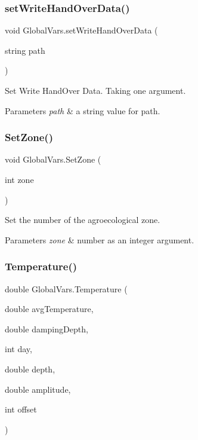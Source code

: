 \subsubsection{\texorpdfstring{setWriteHandOverData()}{setWriteHandOverData()}}
{\footnotesize\ttfamily void Global\+Vars.\+set\+Write\+Hand\+Over\+Data (\begin{DoxyParamCaption}\item[{string}]{path }\end{DoxyParamCaption})\hspace{0.3cm}{\ttfamily [inline]}}



Set Write Hand\+Over Data. Taking one argument. 


\begin{DoxyParams}{Parameters}
{\em path} & a string value for path. \\
\hline
\end{DoxyParams}
\mbox{\label{class_global_vars_acbf66e9e99a98cb7d6e317afaba4519e}} 
\subsubsection{\texorpdfstring{SetZone()}{SetZone()}}
{\footnotesize\ttfamily void Global\+Vars.\+Set\+Zone (\begin{DoxyParamCaption}\item[{int}]{zone }\end{DoxyParamCaption})\hspace{0.3cm}{\ttfamily [inline]}}



Set the number of the agroecological zone. 


\begin{DoxyParams}{Parameters}
{\em zone} & number as an integer argument. \\
\hline
\end{DoxyParams}
\mbox{\label{class_global_vars_a491bc8bab10f56f0c721d2b86c6e5a30}} 
\subsubsection{\texorpdfstring{Temperature()}{Temperature()}}
{\footnotesize\ttfamily double Global\+Vars.\+Temperature (\begin{DoxyParamCaption}\item[{double}]{avg\+Temperature,  }\item[{double}]{damping\+Depth,  }\item[{int}]{day,  }\item[{double}]{depth,  }\item[{double}]{amplitude,  }\item[{int}]{offset }\end{DoxyParamCaption})\hspace{0.3cm}{\ttfamily [inline]}}



